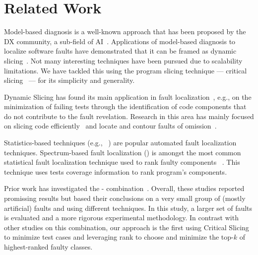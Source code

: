 \documentclass{article}
\begin{document}
%
\section{Related Work}

Model-based diagnosis is a well-known approach that has been proposed by the DX
community, a sub-field of
AI~\cite{REITER198757,wotawa2002relationship,DEKLEER200325}. Applications of
model-based diagnosis to localize software faults have demonstrated that it can
be framed as dynamic
slicing~\cite{Mayer:2008:EMM:1642931.1642950,mayer2008prioritising,nica2013use}.
Not many interesting techniques have been pursued due to scalability
limitations. We have tackled this using the program slicing technique ---
critical slicing~\cite{DeMillo:1996:CSS:229000.226310} --- for its simplicity
and generality.

Dynamic Slicing has found its main application in fault
localization~\cite{Agrawal:1990:DPS:93542.93576}, e.g.,  on the minimization of
failing tests through the identification of code components that do not
contribute to the fault revelation. Research in this area has mainly focused on
slicing code
efficiently~\cite{Wang:2008:DSJ:1330017.1330021,Wang:2004:UCB:998675.999455} and
locate and contour faults of
omission~\cite{Zhang:2007:TLE:1250734.1250782,Lin:2018:BDE:3238147.3238163}.

Statistics-based techniques (e.g., ~\cite{Pearson:2017:EIF:3097368.3097441}) are
popular automated fault localization techniques. Spectrum-based fault
localization (\sfl{}) is amongst the most common statistical fault localization
technique used to rank faulty components
~\cite{7390282,DBLP:conf/kbse/JonesH05,DBLP:journals/smr/LuciaLJTB14,DBLP:journals/jss/AbreuZGG09}.
This technique uses tests coverage information to rank program's components.

Prior work has investigated the \ds{}-\sfl{}
combination~\cite{Wotawa:2010:FLB:1848650.1849235,Alves:2011:FUD:2190078.2190115,DBLP:conf/ecai/HoferW12,lei-mao-dai-wang-2012,slicing-sfl-repair,christi2018reduce}.
Overall, these studies reported promissing results but based their conclusions
on a very small group of (mostly artificial) faults and using different
techniques. In this
study, a larger set of faults is evaluated and a more rigorous experimental
methodology.
In contrast with other studies on this combination,
our approach is the first using Critical Slicing to minimize test cases
and leveraging \sfl{} rank to choose and minimize the top-$k$ of
highest-ranked faulty classes.
\end{document}
